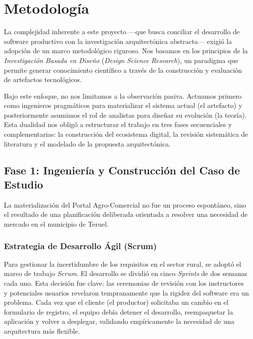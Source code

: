 \section{Metodología}

La complejidad inherente a este proyecto —que busca conciliar el desarrollo de software productivo con la investigación arquitectónica abstracta— exigió la adopción de un marco metodológico riguroso. Nos basamos en los principios de la \textit{Investigación Basada en Diseño} (\textit{Design Science Research}), un paradigma que permite generar conocimiento científico a través de la construcción y evaluación de artefactos tecnológicos.

Bajo este enfoque, no nos limitamos a la observación pasiva. Actuamos primero como ingenieros pragmáticos para materializar el sistema actual (el artefacto) y posteriormente asumimos el rol de analistas para diseñar su evolución (la teoría). Esta dualidad nos obligó a estructurar el trabajo en tres fases secuenciales y complementarias: la construcción del ecosistema digital, la revisión sistemática de literatura y el modelado de la propuesta arquitectónica.

\subsection{Fase 1: Ingeniería y Construcción del Caso de Estudio}

La materialización del Portal Agro-Comercial no fue un proceso espontáneo, sino el resultado de una planificación deliberada orientada a resolver una necesidad de mercado en el municipio de Teruel.

\subsubsection{Estrategia de Desarrollo Ágil (Scrum)}

Para gestionar la incertidumbre de los requisitos en el sector rural, se adoptó el marco de trabajo \textit{Scrum}. El desarrollo se dividió en cinco \textit{Sprints} de dos semanas cada uno. Esta decisión fue clave: las ceremonias de revisión con los instructores y potenciales usuarios revelaron tempranamente que la rigidez del software era un problema. Cada vez que el cliente (el productor) solicitaba un cambio en el formulario de registro, el equipo debía detener el desarrollo, reempaquetar la aplicación y volver a desplegar, validando empíricamente la necesidad de una arquitectura más flexible.

